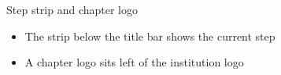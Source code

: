 \begin{standardframe}{Step strip and chapter logo}
	\begin{itemize}
		\item The strip below the title bar shows the current step
		\item A chapter logo sits left of the institution logo
	\end{itemize}
\end{standardframe}

